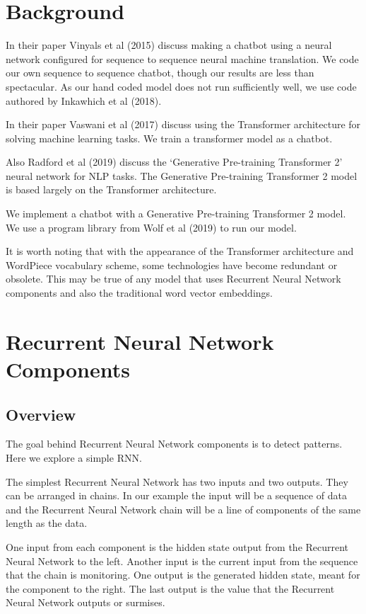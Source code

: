 
\section{Background}

In their paper Vinyals et al (2015)\cite{DBLP:journals/corr/VinyalsL15} discuss making a chatbot using a neural network configured for sequence to sequence neural machine translation. We code our own sequence to sequence chatbot, though our results are less than spectacular. As our hand coded model does not run sufficiently well, we use code authored by Inkawhich et al (2018)\cite{2018Inkawhich}.

In their paper Vaswani et al (2017)\cite{Vaswani2017AttentionIA} discuss using the Transformer architecture for solving machine learning tasks. We train a transformer model as a chatbot.

Also Radford et al (2019)\cite{radford2019language} discuss the `Generative Pre-training Transformer 2' neural network for \ac{NLP} tasks. The Generative Pre-training Transformer 2 model is based largely on the Transformer architecture. 

We implement a chatbot with a Generative Pre-training Transformer 2 model. We use a program library from Wolf et al (2019)\cite{Wolf2019HuggingFacesTS} to run our model.

It is worth noting that with the appearance of the Transformer architecture and WordPiece vocabulary scheme, some technologies have become redundant or obsolete. This may be true of any model that uses Recurrent Neural Network components and also the traditional word vector embeddings.

\section{Recurrent Neural Network Components}

\subsection*{Overview}
The goal behind Recurrent Neural Network components is to detect patterns. Here we explore a simple \ac{RNN}.

The simplest Recurrent Neural Network has two inputs and two outputs. They can be arranged in chains. In our example the input will be a sequence of data and the Recurrent Neural Network chain will be a line of components of the same length as the data.

One input from each component is the hidden state output from the Recurrent Neural Network to the left. Another input is the current input from the sequence that the chain is monitoring. One output is the generated hidden state, meant for the component to the right. The last output is the value that the Recurrent Neural Network outputs or surmises. 

